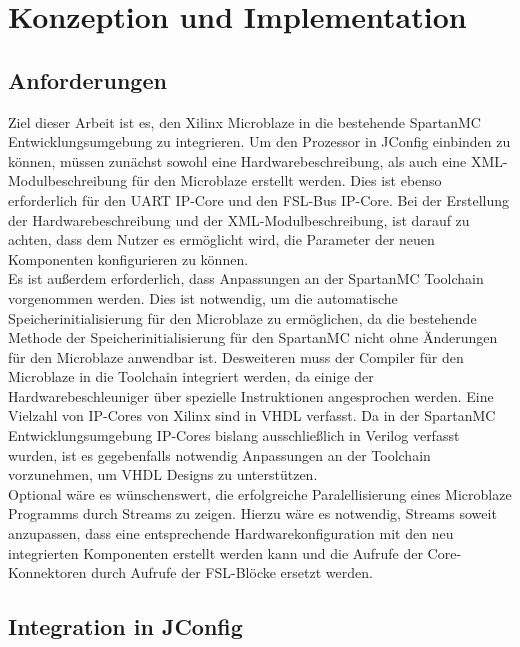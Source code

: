 \chapter{Konzeption und Implementation}
\section{Anforderungen}
Ziel dieser Arbeit ist es, den Xilinx Microblaze in die bestehende SpartanMC Entwicklungsumgebung zu integrieren. Um den Prozessor in JConfig einbinden zu können, müssen zunächst sowohl eine Hardwarebeschreibung, als auch eine XML-Modulbeschreibung für den Microblaze erstellt werden. Dies ist ebenso erforderlich für den UART IP-Core und den FSL-Bus IP-Core. Bei der Erstellung der Hardwarebeschreibung und der XML-Modulbeschreibung, ist darauf zu achten, dass dem Nutzer es ermöglicht wird, die Parameter der neuen Komponenten konfigurieren zu können.\\
Es ist außerdem erforderlich, dass Anpassungen an der SpartanMC Toolchain vorgenommen werden. Dies ist notwendig, um die automatische Speicherinitialisierung für den Microblaze zu ermöglichen, da die bestehende Methode der Speicherinitialisierung für den SpartanMC nicht ohne Änderungen für den Microblaze anwendbar ist. Desweiteren muss der Compiler für den Microblaze in die Toolchain integriert werden, da einige der Hardwarebeschleuniger über spezielle Instruktionen angesprochen werden. Eine Vielzahl von IP-Cores von Xilinx sind in VHDL verfasst. Da in der SpartanMC Entwicklungsumgebung IP-Cores bislang ausschließlich in Verilog verfasst wurden, ist es gegebenfalls notwendig Anpassungen an der Toolchain vorzunehmen, um VHDL Designs zu unterstützen.\\
Optional wäre es wünschenswert, die erfolgreiche Paralellisierung eines Microblaze Programms durch \textmu\/Streams zu zeigen. Hierzu wäre es notwendig, 
\textmu\/Streams soweit anzupassen, dass eine entsprechende Hardwarekonfiguration mit den neu integrierten Komponenten erstellt werden kann und
die Aufrufe der Core-Konnektoren durch Aufrufe der FSL-Blöcke ersetzt werden.
\section{Integration in JConfig}
